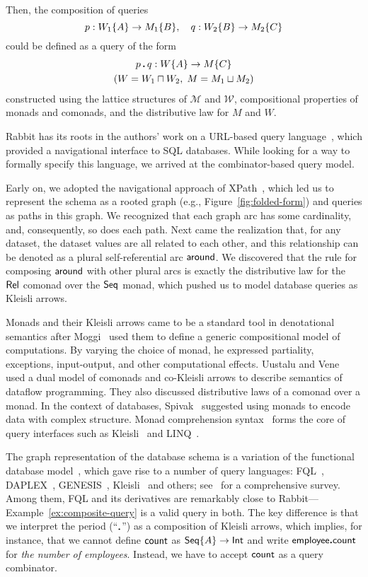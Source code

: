 Then, the composition of queries
\begin{equation*}
    p : W_1{\left\{A\right\}} \to M_1{\left\{B\right\}}, \quad q : W_2{\left\{B\right\}} \to M_2{\left\{C\right\}}
\end{equation*}
could be defined as a query of the form
\begin{multline*}
    p\,\boldsymbol{.}\,q : W{\left\{A\right\}} \to M{\left\{C\right\}} \\ (W = W_1 \sqcap W_2,\; M = M_1 \sqcup M_2)
\end{multline*}
constructed using the lattice structures of $\mathcal{M}$ and $\mathcal{W}$,
compositional properties of monads and comonads, and the distributive law for
$M$ and $W$.

Rabbit has its roots in the authors' work on a URL-based query
language~\cite{Evans2007}, which provided a navigational interface to SQL
databases.  While looking for a way to formally specify this language, we
arrived at the combinator-based query model.

Early on, we adopted the navigational approach of XPath~\cite{Clark1999}, which
led us to represent the schema as a rooted graph (e.g.,
Figure~\ref{fig:folded-form}) and queries as paths in this graph.  We
recognized that each graph arc has some cardinality, and, consequently, so does
each path.  Next came the realization that, for any dataset, the dataset values
are all related to each other, and this relationship can be denoted as a plural
self-referential arc $\mathsf{around}$.  We discovered that the rule for composing
$\mathsf{around}$ with other plural arcs is exactly the distributive law for the
$\mathsf{Rel}$ comonad over the $\mathsf{Seq}$ monad, which pushed us to model
database queries as Kleisli arrows.

Monads and their Kleisli arrows came to be a standard tool in denotational
semantics after Moggi~\cite{Moggi1991} used them to define a generic
compositional model of computations.  By varying the choice of monad, he
expressed partiality, exceptions, input-output, and other computational
effects.  Uustalu and Vene~\cite{Uustalu2005} used a dual model of comonads and
co-Kleisli arrows to describe semantics of dataflow programming.  They also
discussed distributive laws of a comonad over a monad.  In the context of
databases, Spivak~\cite{Spivak2012} suggested using monads to encode data with
complex structure.  Monad comprehension syntax~\cite{Trinder1989, Buneman1994}
forms the core of query interfaces such as Kleisli~\cite{Wong2000} and
LINQ~\cite{Meijer2006}.

The graph representation of the database schema is a variation of the
functional database model~\cite{Kerschberg1976, Sibley1977}, which gave rise to
a number of query languages: FQL~\cite{Buneman1979}, DAPLEX~\cite{Shipman1981},
GENESIS~\cite{Batory1988}, Kleisli~\cite{Wong2000} and others;
see~\cite{Gray2004} for a comprehensive survey.  Among them, FQL and its
derivatives are remarkably close to Rabbit---Example~\ref{ex:composite-query}
is a valid query in both.  The key difference is that we interpret the period
(``$\boldsymbol{.}$'') as a composition of Kleisli arrows, which implies, for instance,
that we cannot define $\mathsf{count}$ as $\mathsf{Seq}{\left\{A\right\}}\to\mathsf{Int}$ and write
$\mathsf{employee}\boldsymbol{.}\mathsf{count}$ for \emph{the number of employees}.  Instead, we have to
accept $\mathsf{count}$ as a query combinator.

